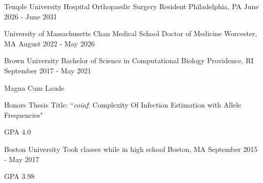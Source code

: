 
\begin{cventries}

  \cventry
  {Temple University Hospital} %
  {Orthopaedic Surgery Resident} %
  {Philadelphia, PA} %
  {June 2026 - June 2031} %
  {}

  \cventry
  {University of Massachusetts Chan Medical School} %
  {Doctor of Medicine} %
  {Worcester, MA} %
  {August 2022 - May 2026} %
  {}

  \cventry
  {Brown University} %
  {Bachelor of Science in Computational Biology} %
  {Providence, RI} %
  {September 2017 - May 2021} %
  {
    \begin{cvitems}
    \item {Magna Cum Laude}
    \item{Honors Thesis Title: ``\textit{coiaf}: Complexity Of Infection
      Estimation with Allele Frequencies"}
    \item {GPA 4.0}
    \end{cvitems}
  }

  \cventry
  {Boston University} %
  {Took classes while in high school} %
  {Boston, MA} %
  {September 2015 - May 2017} %
  {
    \begin{cvitems}
    \item {GPA 3.98}
    \end{cvitems}
  }

\end{cventries}

